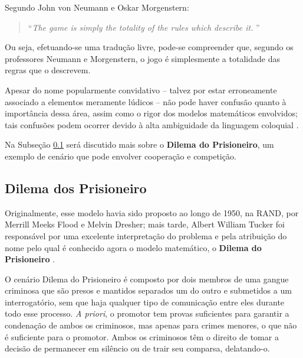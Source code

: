 Segundo John von Neumann e Oskar Morgenstern:

\begin{formal}
\begin{quote}
\begin{flushright}
    \textcolor{citeblue}{\textquotedblleft \textit{The game is simply the totality of the rules which describe it.} \textquotedblright}\\ \citep{10.2307/j.ctt1r2gkx}
\end{flushright}
\end{quote}
\end{formal}

Ou seja, efetuando-se uma tradução livre, pode-se compreender que, segundo os professores Neumann e Morgenstern, o jogo é simplesmente a totalidade das regras que o descrevem.

Apesar do nome popularmente convidativo -- talvez por estar erroneamente associado a elementos meramente lúdicos -- não pode haver confusão quanto à importância dessa área, assim como o rigor dos modelos matemáticos envolvidos; tais confusões podem ocorrer devido à alta ambiguidade da linguagem coloquial \citep{10.2307/j.ctt1r2gkx}.

Na Subseção \ref{subsec:gan_prisoners_dilemma} será discutido mais sobre o \textbf{Dilema do Prisioneiro}, um exemplo de cenário que pode envolver cooperação e competição.




\subsection{Dilema dos Prisioneiro}
\label{subsec:gan_prisoners_dilemma}

Originalmente, esse modelo havia sido proposto ao longo de 1950, na RAND, por Merrill Meeks Flood e Melvin Dresher; mais tarde, Albert William Tucker foi responsável por uma excelente interpretação do problema e pela atribuição do nome pelo qual é conhecido agora o modelo matemático, o \textbf{Dilema do Prisioneiro} \citep{poundstone1992prisoner}.

O cenário Dilema do Prisioneiro é composto por dois membros de uma gangue criminosa que são presos e mantidos separados um do outro e submetidos a um interrogatório, sem que haja qualquer tipo de comunicação entre eles durante todo esse processo. \textit{A priori}, o promotor tem provas suficientes para garantir a condenação de ambos os criminosos, mas apenas para crimes menores, o que não é suficiente para o promotor. Ambos os criminosos têm o direito de tomar a decisão de permanecer em silêncio ou de trair seu comparsa, delatando-o.

